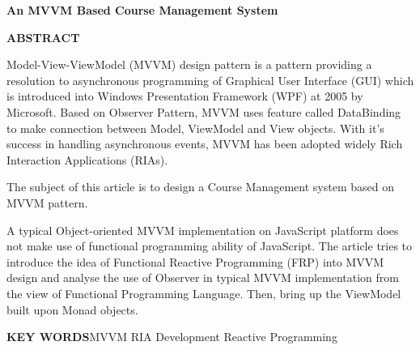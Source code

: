\begin{center}
\textbf{An MVVM Based Course Management System}
\end{center}
\begin{center}
\textbf{ABSTRACT}
\end{center}
\vspace{2mm}

Model-View-ViewModel (MVVM) design pattern is a pattern providing a resolution to asynchronous programming of Graphical User Interface (GUI) which is introduced into Windows Presentation Framework (WPF) at 2005 by Microsoft. Based on Observer Pattern, MVVM uses feature called DataBinding to make connection between Model, ViewModel and View objects. With it's success in handling asynchronous events, MVVM has been adopted widely Rich Interaction Applications (RIAs).

The subject of this article is to design a Course Management system based on MVVM pattern.

A typical Object-oriented MVVM implementation on JavaScript platform does not make use of functional programming ability of JavaScript. The article tries to introduce the idea of Functional Reactive Programming (FRP) into MVVM design and analyse the use of Observer in typical MVVM implementation from the view of Functional Programming Language. Then, bring up the ViewModel built upon Monad objects.

\vspace{3mm}
\textbf{KEY WORDS}\quad MVVM \quad RIA Development \quad Reactive Programming
